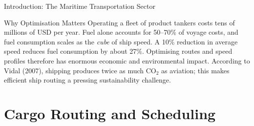 \documentclass[aspectratio=169,10pt]{beamer}
\begin{document}
\begin{frame}[allowframebreaks]{Introduction: The Maritime Transportation Sector}
  \begin{alertblock}{Why Optimisation Matters}
    Operating a fleet of product tankers costs tens of millions of USD per year.
    Fuel alone accounts for 50--70\% of voyage costs, and fuel consumption
    scales as the \emph{cube} of ship speed.  A 10\% reduction in average speed
    reduces fuel consumption by about 27\%.  Optimising routes and speed
    profiles therefore has enormous economic and environmental impact.
    According to Vidal (2007), shipping produces twice as much CO$_2$
    as aviation; this makes efficient ship routing a pressing sustainability
    challenge.
  \end{alertblock}
\end{frame}

\section{Cargo Routing and Scheduling}
\end{document}
